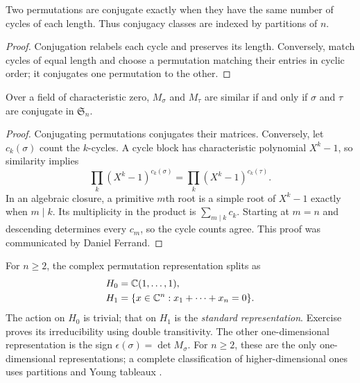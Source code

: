 
\begin{lem}
\label{lem-classes-conjugation-sn}
Two permutations are conjugate exactly when they have the same number
of cycles of each length. Thus conjugacy classes are indexed by partitions
of $n$.
\end{lem}
\begin{proof}
Conjugation relabels each cycle and preserves its length. Conversely,
match cycles of equal length and choose a permutation matching their
entries in cyclic order; it conjugates one permutation to the other.
\end{proof}


\begin{thm}
Over a field of characteristic zero, $M_\sigma$ and $M_\tau$ are similar
if and only if $\sigma$ and $\tau$ are conjugate in $\mathfrak S_n$.
\end{thm}
\begin{proof}
Conjugating permutations conjugates their matrices. Conversely, let
$c_k(\sigma)$ count the $k$-cycles. A cycle block has characteristic
polynomial $X^k-1$, so similarity implies
\begin{equation}
\label{eq-th-brauer-egalite}
 \prod_k(X^k-1)^{c_k(\sigma)}=\prod_k(X^k-1)^{c_k(\tau)}.
\end{equation}
In an algebraic closure, a primitive $m$th root is a simple root of
$X^k-1$ exactly when $m\mid k$. Its multiplicity in the product is
$\sum_{m\mid k}c_k$. Starting at $m=n$ and descending determines every
$c_m$, so the cycle counts agree. This proof was communicated by
Daniel Ferrand.
\end{proof}
For $n\geq2$, the complex permutation representation splits as
\begin{align}
 H_0&=\mathbb{C}(1,\ldots,1),\label{eq-defn-repr-std1}\\
 H_1&=\{x\in\mathbb{C}^n:x_1+\cdots+x_n=0\}.\label{eq-defn-repr-std2}
\end{align}
The action on $H_0$ is trivial; that on $H_1$ is the \emph{standard
representation}. Exercise~ proves its
irreducibility using double transitivity. The other one-dimensional
representation is the sign $\epsilon(\sigma)=\det M_\sigma$. For
$n\geq2$, these are the only one-dimensional representations; a complete
classification of higher-dimensional ones uses partitions and Young
tableaux \cite{fulton}.

